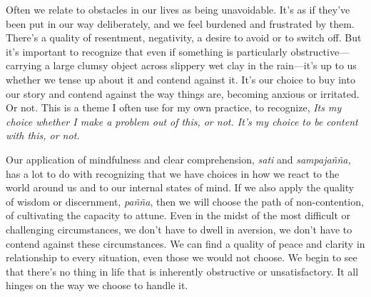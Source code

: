 Often we relate to obstacles in our lives as being unavoidable. It's as 
if they've been put in our way deliberately, and we feel burdened and 
frustrated by them. There's a quality of resentment, negativity, a 
desire to avoid or to switch off. But it's important to recognize that 
even if something is particularly obstructive---carrying a large clumsy 
object across slippery wet clay in the rain---it's up to us whether we 
tense up about it and contend against it. It's our choice to buy into 
our story and contend against the way things are, becoming anxious or 
irritated. Or not. This is a theme I often use for my own practice, to 
recognize, \emph{Its my choice whether I make a problem out of this, or 
not. It's my choice to be content with this, or not.}

Our application of mindfulness and clear comprehension, \emph{sati} and 
\emph{sampajañña,} has a lot to do with recognizing that we have 
choices in how we react to the world around us and to our internal 
states of mind. If we also apply the quality of wisdom or discernment, 
\emph{pañña}, then we will choose the path of non-contention, of 
cultivating the capacity to attune. Even in the midst of the most 
difficult or challenging circumstances, we don't have to dwell in 
aversion, we don't have to contend against these circumstances. We can 
find a quality of peace and clarity in relationship to every situation, 
even those we would not choose. We begin to see that there's no thing 
in life that is inherently obstructive or unsatisfactory. It all hinges 
on the way we choose to handle it.

